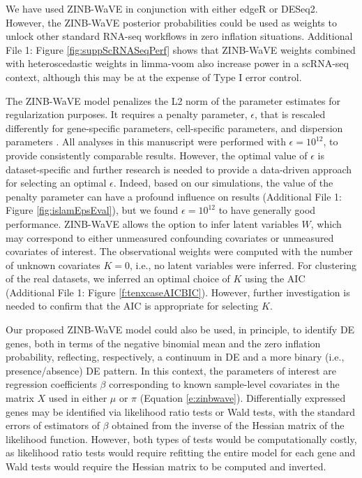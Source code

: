 \documentclass{bmcart}
\newcommand{\RPack}[1]{\textsf{#1}}
\begin{document}
We have used ZINB-WaVE in conjunction with either \RPack{edgeR} or \RPack{DESeq2}. However, the ZINB-WaVE posterior probabilities could be used as weights to unlock other standard RNA-seq workflows in zero inflation situations. Additional File 1: Figure \ref{fig:suppScRNASeqPerf} shows that ZINB-WaVE weights combined with heteroscedastic weights in limma-voom also increase power in a scRNA-seq context, although this may be at the expense of Type I error control. 

The ZINB-WaVE model penalizes the L2 norm of the parameter estimates for regularization purposes. It requires a penalty parameter, $\epsilon$, that is rescaled differently for gene-specific parameters, cell-specific parameters, and dispersion parameters \citep{Risso2017}. All analyses in this manuscript were performed with $\epsilon=10^{12}$, to provide consistently comparable results. However, the optimal value of $\epsilon$ is dataset-specific and further research is needed to provide a data-driven approach for selecting an optimal $\epsilon$. Indeed, based on our simulations, the value of the penalty parameter can have a profound influence on results (Additional File 1: Figure \ref{fig:islamEpsEval}), but we found $\epsilon= 10^{12}$ to have generally good performance. 
ZINB-WaVE allows the option to infer latent variables $W$, which may correspond to either unmeasured confounding covariates or unmeasured covariates of interest. The observational weights were computed with the number of unknown covariates $K=0$, i.e., no latent variables were inferred. For clustering of the real datasets, we inferred an optimal choice of $K$ using the AIC (Additional File 1: Figure \ref{f:tenxcaseAICBIC}). However, further investigation is needed to confirm that the AIC is appropriate for selecting $K$.

Our proposed ZINB-WaVE model could also be used, in principle, to identify DE genes, both in terms of the negative binomial mean and the zero inflation probability, reflecting, respectively, a continuum in DE and a more binary (i.e., presence/absence) DE pattern. In this context, the parameters of interest are regression coefficients $\beta$ corresponding to known sample-level covariates in the matrix $X$ used in either $\mu$ or $\pi$ (Equation \eqref{e:zinbwave}). Differentially expressed genes may be identified via likelihood ratio tests or Wald tests, with the standard errors of estimators of $\beta$ obtained from the inverse of the Hessian matrix of the likelihood function. However, both types of tests would be computationally costly, as likelihood ratio tests would require refitting the entire model for each gene and Wald tests would require the Hessian matrix to be computed and inverted. 
\end{document}
